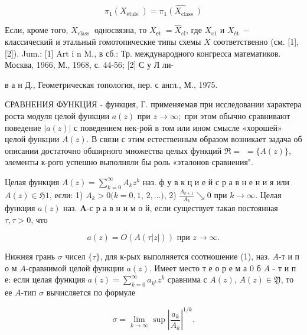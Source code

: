 \documentclass[10pt]{article}
\begin{document}
\[

\pi_{1}\left(X_{\text {étale }}\right)=\widehat{\pi_{1}\left(X_{\text {class }}\right)}

\]



Если, кроме того, $X_{\text {class }}$ односвязна, то $X_{\text {еt }}=\hat{X}_{\mathrm{cl}}$, где $X_{\mathrm{c} 1}$ и $X_{\text {ét }}-$ классический и этальный гомотопические типы схемы $X$ соответственно (см. [1], [2]). Jum.: [1] Art i n M., в сб.: Тр. международного конгресса математиков. Москва, 1966, М., 1968, с. 44-56; [2] С у Л ли-

в а н Д., Геометрическая топология, пер. с англ., М., 1975.



СРАВНЕНИЯ ФУНКЦИЯ - функция, Г. применяемая при исследовании характера роста модуля целой функции $a(z)$ при $z \rightarrow \infty ;$ при этом обычно сравнивают поведение $|a(z)|$ с поведением нек-рой в том или ином смысле «хорошей» целой функции $A(z)$. В связи с этим естественным образом возникает задача об описании достаточно обширного множества целых функций $\mathfrak{\Re}=$ $=\{A(z)\}$, элементы к-рого успешно выполняли бы роль «эталонов сравнения".



Целая функция $A(z)=\sum_{k=0}^{\infty} A_{k} z^{k}$ наз. ф у в к ц и е й с р а в н е н и я или $A(z) \in \mathfrak{H} \mathfrak{1}$, если: 1) $A_{k}>0(k=0,1$, $2, \ldots)$, 2) $\frac{A_{k+1}}{A_{k}} \searrow 0$ при $k \rightarrow \infty$. Целая функция $a(z)$ наз. $\boldsymbol{A}$-с р а в н и м о й, если существует такая постоянная $\tau, \tau>0$, что



\[

a(z)=O(A(\tau|z|)) \text { при } z \rightarrow \infty .

\]



Нижняя грань $\sigma$ чисел $\{\tau\}$, для к-рых выполняется соотношение (1), наз. $A$-т и п о м $A$-сравнимой целой функции $a(z)$. Имеет место т е о р е м а 0 б $A$ - т и п е: если целая функция $a(z)=\sum_{k=0}^{\infty} a_{k^{k}} z^{k}$ сравнима с $A(z)$, $A(z) \in \mathfrak{Y}$, то ее $A$-тип $\sigma$ вычисляется по формуле



\[

\sigma=\lim _{k \rightarrow \infty} \sup \left|\frac{a_{k}}{A_{k}}\right|^{1 / k} .

\]
\end{document}
